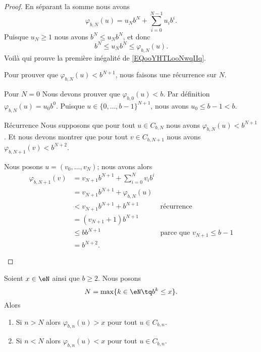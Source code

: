 \begin{proof}
	En séparant la somme nous avons
	\begin{equation}
		\varphi_{b,N}(u)=u_Nb^N+\sum_{i=0}^{N-1}u_ib^i.
	\end{equation}
	Puisque \( u_N\geq 1\) nous avons \( b^N\leq u_Nb^N\), et donc
	\begin{equation}
		b^N\leq u_Nb^N\leq \varphi_{b,N}(u).
	\end{equation}
	Voilà qui prouve la première inégalité de \eqref{EQooYHTLooNwqIIq}.

	Pour prouver que \( \varphi_{b,N}(u)<b^{N+1}\), nous faisons une récurrence sur \( N\).
	\begin{subproof}
		\item[Pour \( N=0\)]
		Nous devons prouver que \( \varphi_{b,0}(u)<b\). Par définition \( \varphi_{b,N}(u)=u_0b^0\). Puisque \( u\in\{ 0,\ldots, b-1 \}^{N+1}\), nous avons \( u_0\leq b-1<b\).
		\item[Récurrence]
		Nous supposons que pour tout \( u\in C_{b,N}\) nous avons \( \varphi_{b,N}(u)<b^{N+1}\). Et nous devons montrer que pour tout \( v\in C_{b,N+1}\) nous avons \( \varphi_{b,N+1}(v)<b^{N+2}\).

		Nous posons \( u=(v_0,\ldots, v_N)\); nous avons alors
		\begin{subequations}
			\begin{align}
				\varphi_{b,N+1}(v) & =   v_{N+1}b^{N+1}+\sum_{i=0}^Nv_ib^i                                    \\
				                   & =   v_{N+1}b^{N+1}+\varphi_{b,N}(u)                                      \\
				                   & <   v_{N+1}b^{N+1}+b^{N+1}            & \text{récurrence}                \\
				                   & =   (v_{N+1}+1)b^{N+1}                                                   \\
				                   & \leq  bb^{N+1}                        & \text{parce que }v_{N+1}\leq b-1 \\
				                   & =   b^{N+2}.
			\end{align}
		\end{subequations}
	\end{subproof}
\end{proof}

\begin{lemma}        \label{LEMooKDKJooSkhcJS}
	Soient \( x\in \eN\) ainsi que \( b\geq 2\). Nous posons
	\begin{equation}
		N=\max\{ k\in \eN\tq b^k\leq x \}.
	\end{equation}
	Alors
	\begin{enumerate}
		\item
		      Si \( n>N\) alors \( \varphi_{b,n}(u)>x\) pour tout \( u\in C_{b,n}\).
		\item
		      Si \( n<N\) alors \( \varphi_{b,n}(u)<x\) pour tout \( u\in C_{b,n}\).
	\end{enumerate}
\end{lemma}

